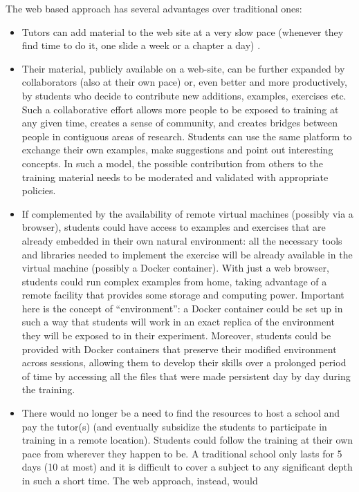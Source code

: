 \documentclass[12pt,a4paper]{article}
\begin{document}
The web based approach has several advantages over traditional ones:
\begin{itemize}
   \item Tutors can add material to the web site at a very slow pace (whenever
   they find time to do it, one slide a week or a chapter a day) .
   \item Their material, publicly available on a web-site, can be further
   expanded by collaborators (also at their own pace) or, even better and more productively, by students
   who decide to contribute new additions, examples, exercises etc. Such a
   collaborative effort allows more people to be exposed to training at any
   given time, creates a sense of community, and creates bridges between people
   in contiguous areas of research. Students can use the same platform to
   exchange their own examples, make suggestions and point out interesting
   concepts. In such a model, the possible contribution from others to the
   training material needs to be moderated and validated with appropriate
   policies.
   \item If complemented by the availability of remote virtual machines
   (possibly via a browser), students could have access to examples and
   exercises that are already embedded in their own natural environment: all the
   necessary tools and libraries needed to implement the exercise will be
   already available in the virtual machine (possibly a Docker container). With just a
   web browser, students could run complex examples from home, taking advantage
   of a remote facility that provides some storage and computing power.
   Important here is the concept of ``environment'': a Docker container could be
   set up in such a way that students will work in an exact replica of the
   environment they will be exposed to in their experiment. Moreover, students 
   could be provided with Docker containers that
   preserve their modified environment across sessions, allowing them to
   develop their skills over a prolonged period of time by accessing all the
   files that were made persistent day by day during the training.
   \item There would no longer be a need to find the resources to host a school
   and pay the tutor(s) (and eventually subsidize the students to participate in
   training in a remote location). Students could follow the training at their
   own pace from wherever they happen to be. A traditional school only lasts for
   5 days (10 at most) and it is difficult to cover a  subject to any
   significant depth in such a short time. The web approach, instead, would

\end{itemize}
\end{document}
